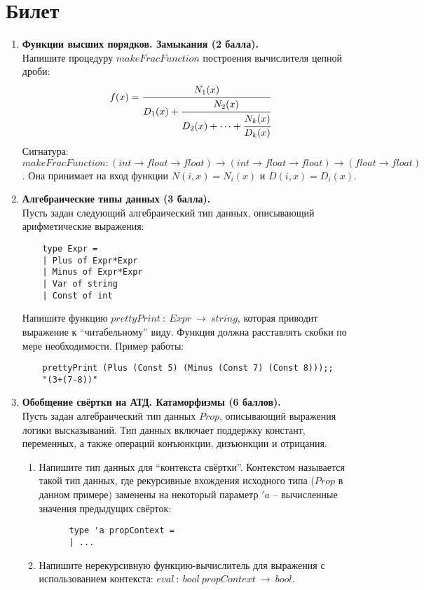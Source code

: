\documentclass[a4paper,11pt]{article}
\newcommand{\<}{\langle}
\renewcommand{\>}{\rangle}
\begin{document}
\section*{Билет }
\begin{enumerate}
\item \textbf{Функции высших порядков. Замыкания (2 балла).}\\
  Напишите процедуру $makeFracFunction$ построения вычислителя цепной дроби:
  $$f(x) = \cfrac{N_1(x)}{D_1(x) + \cfrac{N_2(x)}{D_2(x) + \cdots + \cfrac{N_k(x)}{D_k(x)}}}
  $$
  Сигнатура: $makeFracFunction: (int \to float \to float) \to
  (int \to float \to float) \to (float \to float)$. Она принимает на вход
  функции $N(i, x) = N_i(x)$ и $D(i, x) = D_i(x)$.
\item \textbf{Алгебраические типы данных (3 балла).}\\
  Пусть задан следующий алгебраический тип данных, описывающий
  арифметические выражения:
  \begin{lstlisting}
    type Expr = 
    | Plus of Expr*Expr
    | Minus of Expr*Expr
    | Var of string
    | Const of int
  \end{lstlisting}
  Напишите функцию $prettyPrint~:~Expr~\rightarrow~string$, которая приводит 
  выражение к ``читабельному'' виду. Функция должна расставлять скобки по мере
  необходимости. Пример работы:
  \begin{lstlisting}
    prettyPrint (Plus (Const 5) (Minus (Const 7) (Const 8)));;
    "(3+(7-8))"
  \end{lstlisting}

\item \textbf{Обобщение свёртки на АТД. Катаморфизмы (6 баллов).}\\
  Пусть задан алгебраический тип данных $Prop$, описывающий выражения логики
  высказываний. Тип данных включает поддержку констант, переменных, а также
  операций конъюнкции, дизъюнкции и отрицания.
  \begin{enumerate}
  \item Напишите тип данных для ``контекста свёртки''. Контекстом называется
    такой тип данных, где рекурсивные вхождения исходного типа ($Prop$ в данном
    примере) заменены на некоторый параметр $'\!a$ -- вычисленные значения
    предыдущих свёрток:
    \begin{lstlisting}
      type 'a propContext =
      | ...
    \end{lstlisting}
  \item Напишите нерекурсивную функцию-вычислитель для выражения с 
    использованием контекста: $eval~:~bool~propContext~\rightarrow~bool$.
  \end{enumerate}
\end{enumerate}
\newpage 
\end{document}
